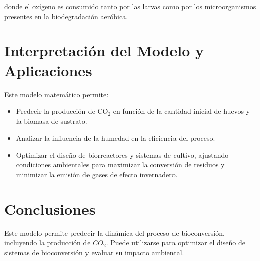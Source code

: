 \documentclass[12pt]{article}
\begin{document}
donde el oxígeno es consumido tanto por las larvas como por los microorganismos presentes en la biodegradación aeróbica.

\section{Interpretación del Modelo y Aplicaciones}
Este modelo matemático permite:
\begin{itemize}
    \item Predecir la producción de CO$_2$ en función de la cantidad inicial de huevos y la biomasa de sustrato.
    \item Analizar la influencia de la humedad en la eficiencia del proceso.
    \item Optimizar el diseño de biorreactores y sistemas de cultivo, ajustando condiciones ambientales para maximizar la conversión de residuos y minimizar la emisión de gases de efecto invernadero.
\end{itemize}

\section{Conclusiones}
Este modelo permite predecir la dinámica del proceso de bioconversión, incluyendo la producción de $CO_2$. Puede utilizarse para optimizar el diseño de sistemas de bioconversión y evaluar su impacto ambiental.

\printbibliography
\end{document}
